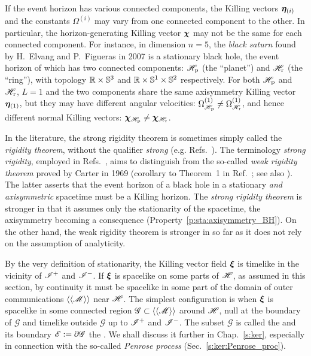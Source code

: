 \begin{remark}
\label{r:sta:dep_eta_Omega}
If the event horizon has various connected components, the Killing vectors
$\bm{\eta}_{(i)}$ and the constants $\Omega^{(i)}$ may vary from one connected
component to the other. In particular, the horizon-generating Killing vector $\bm{\chi}$
may not be the same for each connected component. For instance,
in dimension $n=5$, the \emph{black saturn}
found by H.~Elvang and P.~Figueras in 2007 \cite{ElvanF07}
is a stationary black hole, the event horizon of which has two connected
components: $\mathscr{H}_{\rm p}$ (the ``planet'') and $\mathscr{H}_{\rm r}$ (the ``ring''),
with topology $\mathbb{R}\times\mathbb{S}^3$ and $\mathbb{R}\times\mathbb{S}^1\times\mathbb{S}^2$ respectively.
For both $\mathscr{H}_{\rm p}$ and $\mathscr{H}_{\rm r}$, $L=1$ and
the two components share the same axisymmetry Killing vector $\bm{\eta}_{(1)}$,
but they may have different angular velocities:
$\Omega^{(1)}_{\mathscr{H}_{\rm p}} \neq \Omega^{(1)}_{\mathscr{H}_{\rm r}}$, and hence
different normal Killing vectors: $\bm{\chi}_{\mathscr{H}_{\rm p}} \neq \bm{\chi}_{\mathscr{H}_{\rm r}}$.
\end{remark}

In the literature, the strong rigidity theorem is sometimes simply called
the \emph{rigidity theorem}, without the qualifier \emph{strong}
(e.g. Refs.~\cite{Choqu09,HollaI12}).
The terminology \emph{strong rigidity}, employed in Refs.~\cite{Carte99,ChrusLH12,Heusl96},
aims to distinguish from the so-called
\emph{weak rigidity theorem}
proved by Carter in 1969 (corollary to Theorem~1 in Ref.~\cite{Carte69}; see also \cite{Carte72}). The latter asserts that the event horizon of a black hole in a stationary \emph{and axisymmetric}
spacetime must be a Killing horizon. The \emph{strong rigidity theorem} is
stronger in that it assumes only the stationarity of the spacetime, the axisymmetry
becoming a consequence (Property~\ref{p:sta:axisymmetry_BH}). On the other hand,
the weak rigidity theorem is stronger in so far as it does not rely on the
assumption of analyticity.

By the very definition of stationarity, the Killing vector field $\bm{\xi}$ is
timelike in the vicinity of $\mathscr{I}^+$ and $\mathscr{I}^-$. If $\bm{\xi}$ is spacelike
on some parts of $\mathscr{H}$, as assumed in this section, by continuity it must be spacelike
in some part of the domain of outer communications $\langle\langle \mathscr{M}\rangle\rangle$
near $\mathscr{H}$. The simplest configuration is when
$\bm{\xi}$ is spacelike in some connected region $\mathscr{G}\subset \langle\langle \mathscr{M}\rangle\rangle$
around $\mathscr{H}$, null at the boundary of $\mathscr{G}$ and timelike outside $\mathscr{G}$
up to $\mathscr{I}^+$ and $\mathscr{I}^-$. The subset $\mathscr{G}$ is
called the  and its boundary $\mathscr{E}:=\partial\mathscr{G}$
the . We shall discuss it further in Chap.~\ref{s:ker},
especially in connection with the so-called \emph{Penrose process}
(Sec.~\ref{s:ker:Penrose_proc}).

